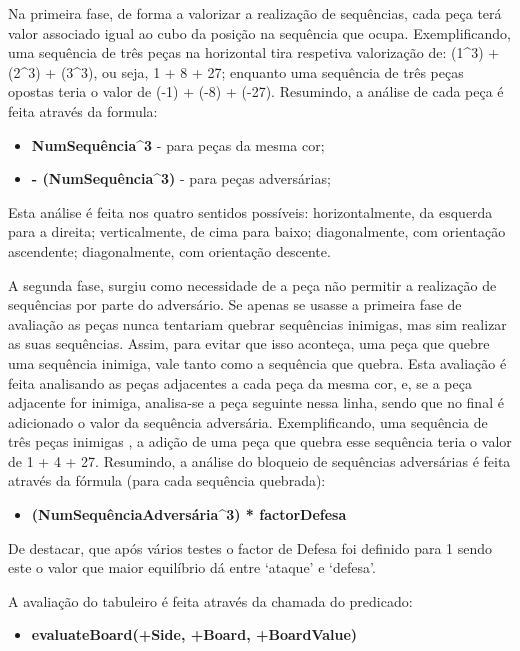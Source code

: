 \documentclass[a4paper]{article}
\begin{document}
Na primeira fase, de forma a valorizar a realização de sequências, cada peça terá valor associado igual ao cubo da posição na sequência que ocupa. Exemplificando, uma sequência de três peças na horizontal tira respetiva valorização de: (1\textasciicircum3) + (2\textasciicircum3) + (3\textasciicircum3), ou seja, 1 + 8 + 27; enquanto uma sequência de três peças opostas teria o valor de (-1) + (-8) + (-27). Resumindo, a análise de cada peça é feita através da formula:
\begin{itemize}
	\item \textbf{ NumSequência\textasciicircum3} - para peças da mesma cor;
	\item \textbf{- (NumSequência\textasciicircum3)} - para peças adversárias;
\end{itemize}
Esta análise é feita nos quatro sentidos possíveis: horizontalmente, da esquerda para a direita; verticalmente, de cima para baixo; diagonalmente, com orientação ascendente; diagonalmente, com orientação descente.

A segunda fase, surgiu como necessidade de a peça não permitir a realização de sequências por parte do adversário. Se apenas se usasse a primeira fase de avaliação as peças nunca tentariam quebrar sequências inimigas, mas sim realizar as suas sequências. Assim, para evitar que isso aconteça, uma peça que quebre uma sequência inimiga, vale tanto como a sequência que quebra. Esta avaliação é feita analisando as peças adjacentes a cada peça da mesma cor, e, se a peça adjacente for inimiga, analisa-se a peça seguinte nessa linha, sendo que no final é adicionado o valor da sequência adversária. Exemplificando, uma sequência de três peças inimigas , a adição de uma peça que quebra esse sequência teria o valor de 1 + 4 + 27. Resumindo, a análise do bloqueio de sequências adversárias é feita através da fórmula (para cada sequência quebrada):
\begin{itemize}
	\item \textbf{(NumSequênciaAdversária\textasciicircum3) * factorDefesa}
\end{itemize}
De destacar, que após vários testes o factor de Defesa foi definido para 1 sendo este o valor que maior equilíbrio dá entre `ataque' e `defesa'.

A avaliação do tabuleiro é feita através da chamada do predicado:
\begin{itemize}
	\item \textbf{evaluateBoard(+Side, +Board, +BoardValue)}
\end{itemize}
\end{document}
